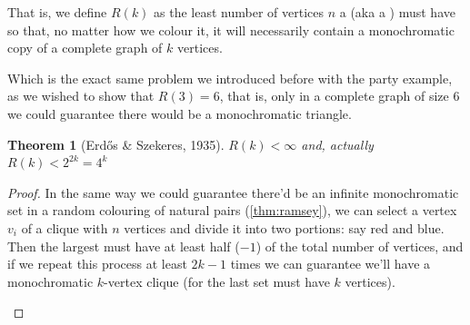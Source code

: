 \documentclass[english, dark, index]{Iart}
\newtheorem{theorem}{Theorem}[part]
\begin{document}
	
	That is, we define $ R(k) $ as the least number of vertices $ n $ a  (aka a ) must have so that, no matter how we colour it, it will necessarily contain a monochromatic copy of a complete graph of $ k $ vertices.
	
	Which is the exact same problem we introduced before with the party example, as we wished to show that $ R(3)=6 $, that is, only in a complete graph of size $ 6 $ we could guarantee there would be a monochromatic triangle.

	\begin{theorem}[Erdős \& Szekeres, 1935]
		$ R(k)<\infty $ and, actually $ R(k)<2^{2k}=4^{k} $
	\end{theorem}

	\begin{proof}
		In the same way we could guarantee there'd be an infinite monochromatic set in a random colouring of natural pairs (\ref{thm:ramsey}), we can select a vertex $ v_i $ of a clique with $ n $ vertices and divide it into two portions: say red and blue. Then the largest must have at least half ($ -1 $) of the total number of vertices, and if we repeat this process at least $ 2k-1 $ times we can guarantee we'll have a monochromatic $ k $-vertex clique (for the last set must have $ k $ vertices).
		
		
		\begin{center}
		\end{center}
	\end{proof}
\end{document}
